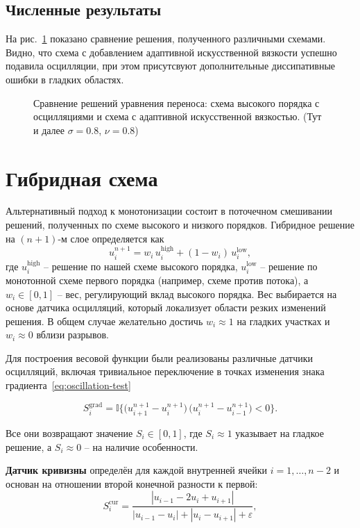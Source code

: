 \documentclass[14pt]{report}
\begin{document}
\subsection{Численные результаты}
На рис.~\ref{fig:adaptive-artificial-viscosity} показано сравнение решения, полученного различными схемами. Видно, что схема с добавлением адаптивной искусственной вязкости успешно подавила осцилляции, при этом присутсвуют дополнительные диссипативные ошибки в гладких областях.

\begin{figure}[ht]
\centering

\caption{Сравнение решений уравнения переноса: схема высокого порядка с осцилляциями и схема с адаптивной искусственной вязкостью. (Тут и далее $\sigma = 0.8$, $\nu = 0.8$)}
\label{fig:adaptive-artificial-viscosity}
\end{figure}

\section{Гибридная схема}
Альтернативный подход к монотонизации состоит в поточечном смешивании решений, полученных по схеме высокого и низкого порядков. Гибридное решение на $(n+1)$-м слое определяется как
\begin{equation}
u^{n+1}_i = w_i\, u^{\text{high}}_i + (1-w_i)\, u^{\text{low}}_i,
\label{eq:hybrid}
\end{equation}
где $u^{\text{high}}_i$ -- решение по нашей схеме высокого порядка, $u^{\text{low}}_i$ -- решение по монотонной схеме первого порядка (например, схеме против потока), а $w_i \in [0,1]$ -- вес, регулирующий вклад высокого порядка. Вес выбирается на основе датчика осцилляций, который локализует области резких изменений решения. В общем случае желательно достичь $w_i \approx 1$ на гладких участках и $w_i \approx 0$ вблизи разрывов.

Для построения весовой функции были реализованы различные датчики осцилляций, включая тривиальное переключение в точках изменения знака градиента~\eqref{eq:oscillation-test} 

\[
    S^{\text{grad}}_i = \mathbb{I}\{\bigl(u_{i+1}^{n+1} - u_i^{n+1}\bigr) \,
    \bigl(u_i^{n+1} - u_{i-1}^{n+1}\bigr) < 0\}.
\]

Все они возвращают значение $S_i \in [0,1]$, где $S_i \approx 1$ указывает на гладкое решение, а $S_i \approx 0$ -- на наличие особенности.

\textbf{Датчик кривизны} определён для каждой внутренней ячейки $i = 1,\dots,n-2$ и основан на отношении второй конечной разности к первой:
\begin{equation}
S_i^{\text{cur}} = \frac{|u_{i-1} - 2u_i + u_{i+1}|}{|u_{i-1} - u_i| + |u_i - u_{i+1}| + \varepsilon},
\end{equation}
\end{document}
